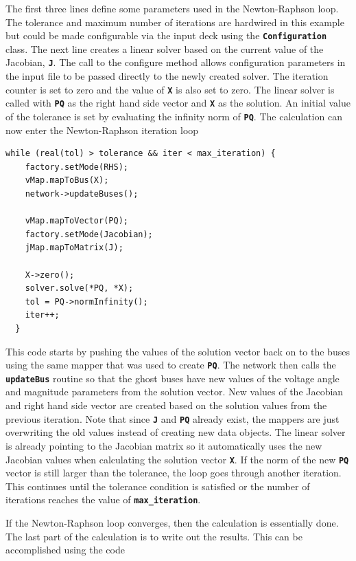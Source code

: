 \documentclass[12pt]{report} %
\begin{document}
The first three lines define some parameters used in the Newton-Raphson loop. The tolerance and maximum number of iterations are hardwired in this example but could be made configurable via the input deck using the \texttt{\textbf{Configuration}} class. The next line creates a linear solver based on the current value of the Jacobian, \texttt{\textbf{J}}. The call to the configure method allows configuration parameters in the input file to be passed directly to the newly created solver. The iteration counter is set to zero and the value of \texttt{\textbf{X}} is also set to zero. The linear solver is called with \texttt{\textbf{PQ}} as the right hand side vector and \texttt{\textbf{X}} as the solution. An initial value of the tolerance is set by evaluating the infinity norm of \texttt{\textbf{PQ}}. The calculation can now enter the Newton-Raphson iteration loop

{
\color{red}
\begin{Verbatim}[fontseries=b]
  while (real(tol) > tolerance && iter < max_iteration) {
    factory.setMode(RHS);
    vMap.mapToBus(X);
    network->updateBuses();

    vMap.mapToVector(PQ);
    factory.setMode(Jacobian);
    jMap.mapToMatrix(J);

    X->zero();
    solver.solve(*PQ, *X);
    tol = PQ->normInfinity();
    iter++;
  }
\end{Verbatim}
}

This code starts by pushing the values of the solution vector back on to the buses using the same mapper that was used to create \texttt{\textbf{PQ}}. The network then calls the \texttt{\textbf{updateBus}} routine so that the ghost buses have new values of the voltage angle and magnitude parameters from the solution vector. New values of the Jacobian and right hand side vector are created based on the solution values from the previous iteration. Note that since \texttt{\textbf{J}} and \texttt{\textbf{PQ}} already exist, the mappers are just overwriting the old values instead of creating new data objects. The linear solver is already pointing to the Jacobian matrix so it automatically uses the new Jacobian values when calculating the solution vector \texttt{\textbf{X}}. If the norm of the new \texttt{\textbf{PQ}} vector is still larger than the tolerance, the loop goes through another iteration. This continues until the tolerance condition is satisfied or the number of iterations reaches the value of \texttt{\textbf{max\_iteration}}.

If the Newton-Raphson loop converges, then the calculation is essentially done. The last part of the calculation is to write out the results. This can be accomplished using the code
\end{document}
